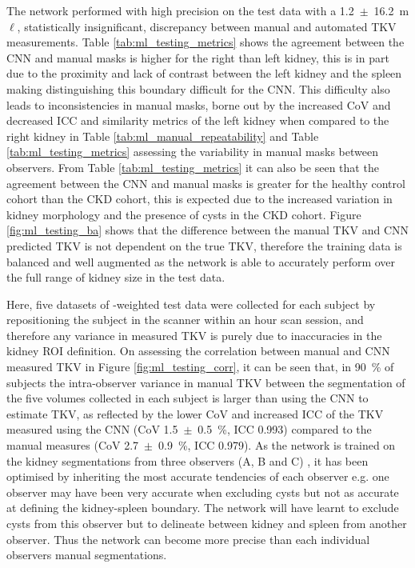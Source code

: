 The network performed with high precision on the test data with a 1.2~$\pm$~16.2~m$\ell$, statistically insignificant, discrepancy between manual and automated \ac{TKV} measurements. Table \ref{tab:ml_testing_metrics} shows the agreement between the \ac{CNN} and manual masks is higher for the right than left kidney, this is in part due to the proximity and lack of contrast between the left kidney and the spleen making distinguishing this boundary difficult for the \ac{CNN}. This difficulty also leads to inconsistencies in manual masks, borne out by the increased \ac{CoV} and decreased \ac{ICC} and similarity metrics of the left kidney when compared to the right kidney in Table \ref{tab:ml_manual_repeatability} and Table \ref{tab:ml_testing_metrics} assessing the variability in manual masks between observers. From Table \ref{tab:ml_testing_metrics} it can also be seen that the agreement between the \ac{CNN} and manual masks is greater for the healthy control cohort than the \ac{CKD} cohort, this is expected due to the increased variation in kidney morphology and the presence of cysts in the \ac{CKD} cohort. Figure \ref{fig:ml_testing_ba} shows that the difference between the manual \ac{TKV} and \ac{CNN} predicted \ac{TKV} is not dependent on the true \ac{TKV}, therefore the training data is balanced and well augmented as the network is able to accurately perform over the full range of kidney size in the test data. 

Here, five datasets of \ttwo-weighted test data were collected for each subject by repositioning the subject in the scanner within an hour scan session, and therefore any variance in measured \ac{TKV} is purely due to inaccuracies in the kidney \ac{ROI} definition. On assessing the correlation between manual and \ac{CNN} measured \ac{TKV} in Figure \ref{fig:ml_testing_corr}, it can be seen that, in 90~\% of subjects the intra-observer variance in manual \ac{TKV} between the segmentation of the five volumes collected in each subject is larger than using the \ac{CNN} to estimate \ac{TKV}, as reflected by the lower \ac{CoV} and increased \ac{ICC} of the \ac{TKV} measured using the \ac{CNN} (\ac{CoV} 1.5~$\pm$~0.5~\%, \ac{ICC} 0.993) compared to the manual measures (\ac{CoV} 2.7~$\pm$~0.9~\%, ICC 0.979). As the network is trained on the kidney segmentations from three observers (A, B and C) , it has been optimised by inheriting the most accurate tendencies of each observer e.g. one observer may have been very accurate when excluding cysts but not as accurate at defining the kidney-spleen boundary. The network will have learnt to exclude cysts from this observer but to delineate between kidney and spleen from another observer. Thus the network can become more precise than each individual observers manual segmentations. 

